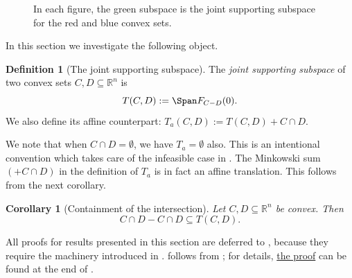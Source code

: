 \documentclass{article}
\theoremstyle{plain}
\newtheorem{corollary}{Corollary}[section]
\theoremstyle{definition}
\newtheorem{definition}{Definition}[section]
\theoremstyle{remark}
\begin{document}
\begin{figure}[htbp]
\begin{subfigure}{0.32\textwidth}
        \end{subfigure}
    \caption{In each figure, the green subspace is the joint supporting subspace for the red and blue convex sets.}
    \label{fig:combined}
\end{figure}
In this section we investigate the
following object.
\begin{definition}[The joint supporting subspace]
\label{loc:the_joint_supporting_subspace.statement}
The \emph{joint supporting subspace} of two convex sets $C, D \subseteq \mathbb{R}^n$ is
\begin{equation*}
T(C, D) := \Span F_{C-D}(0).
\end{equation*}
We also define its affine counterpart: $T_a(C, D) := T(C,D) + C \cap D$.
\end{definition}
We note that when $C \cap D =  \emptyset$, we have $T_a = \emptyset$ also.
This is an intentional convention which takes care of the infeasible case
in .
The Minkowski sum $(+ C \cap D)$ in the definition of $T_a$ is in fact
an affine translation. This follows from the next corollary.
\begin{corollary}[Containment of the intersection]
\label{loc:containment_of_the_intersection_in_the_joint_supporting_subspace.statement}
Let $C, D \subseteq \mathbb{R}^n$ be convex. Then
\begin{equation*}
C \cap D - C \cap D \subseteq T(C, D).
\end{equation*}
\end{corollary}
All proofs for results presented in this section are deferred to , because they require
the machinery introduced in .  follows from ; for details, \hyperlink{loc:containment_of_the_intersection_in_the_joint_supporting_subspace.proof}{the proof} can be found at the end of .
\end{document}
